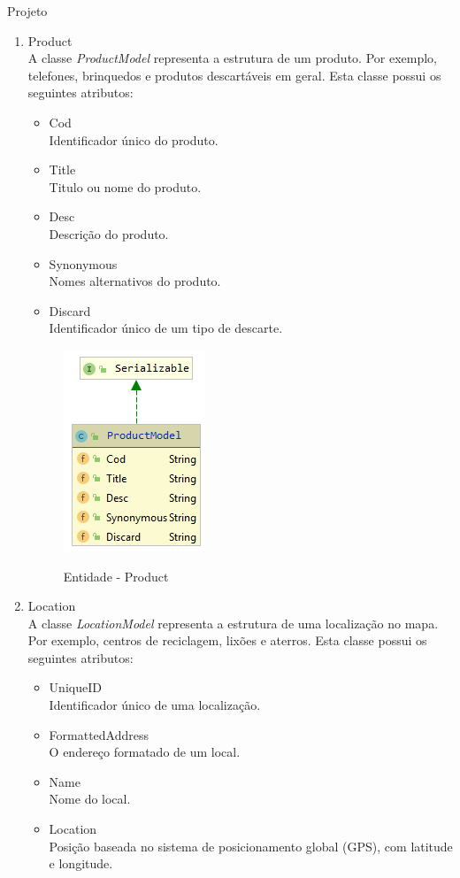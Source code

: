 \documentclass[
	12pt,				%
	openright,			%
	twoside,			%
	a4paper,			%
	english,			%
	french,				%
	spanish,			%
	brazil				%
	]{abntex2}
\begin{document}
\begin{chapter}{Projeto}
\begin{enumerate}
  \item{Product} \\ A classe \textit{ProductModel} representa a estrutura de um produto. Por exemplo, telefones, brinquedos e produtos descartáveis em geral. Esta classe possui os seguintes atributos:
  
     \begin{itemize}
  \item{Cod}\\ Identificador único do produto.
     \item{Title}\\ Titulo ou nome do produto.
       \item{Desc}\\ Descrição do produto.
         \item{Synonymous}\\ Nomes alternativos do produto.
                  \item{Discard}\\ Identificador único de um tipo de descarte.
\end{itemize}
  
\begin{figure}[h]
\centering
   \caption{Entidade - Product}
   \includegraphics[scale=1.0]{media/ProductModel.png}
     \label{fig:productModel}
\end{figure}


  \item{Location}  \\ A classe \textit{LocationModel} representa a estrutura de uma localização no mapa. Por exemplo, centros de reciclagem, lixões e aterros. Esta classe possui os seguintes atributos:
  
       \begin{itemize}
  \item{UniqueID}\\ Identificador único de uma localização.
     \item{FormattedAddress}\\ O endereço formatado de um local.
       \item{Name}\\ Nome do local.
         \item{Location}\\ Posição baseada no sistema de posicionamento global (GPS), com latitude e longitude.
\end{itemize}
  

\end{enumerate}
\end{chapter}
\end{document}
